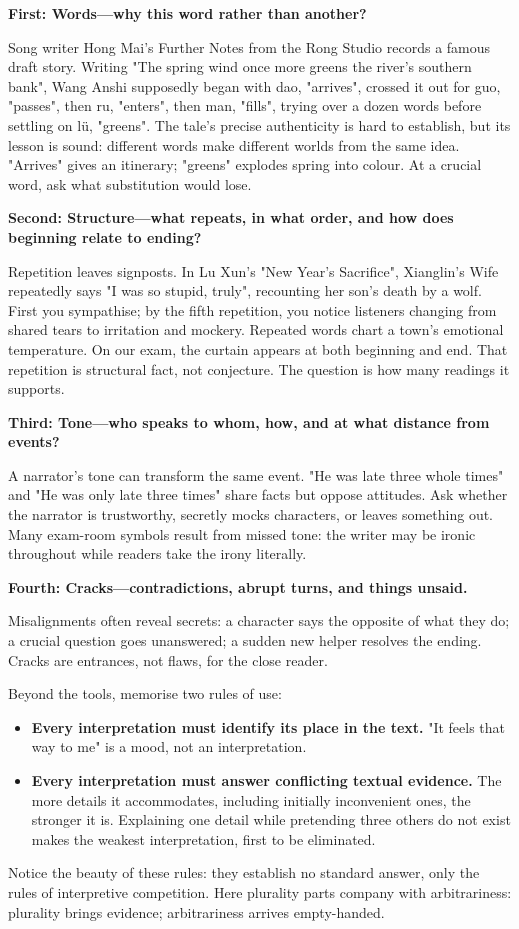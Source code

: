 \textbf{First: Words---why this word rather than another?}

Song writer Hong Mai's Further Notes from the Rong Studio records a famous draft story. Writing "The spring wind once more greens the river's southern bank", Wang Anshi supposedly began with dao, "arrives", crossed it out for guo, "passes", then ru, "enters", then man, "fills", trying over a dozen words before settling on lü, "greens". The tale's precise authenticity is hard to establish, but its lesson is sound: different words make different worlds from the same idea. "Arrives" gives an itinerary; "greens" explodes spring into colour. At a crucial word, ask what substitution would lose.

\textbf{Second: Structure---what repeats, in what order, and how does beginning relate to ending?}

Repetition leaves signposts. In Lu Xun's "New Year's Sacrifice", Xianglin's Wife repeatedly says "I was so stupid, truly", recounting her son's death by a wolf. First you sympathise; by the fifth repetition, you notice listeners changing from shared tears to irritation and mockery. Repeated words chart a town's emotional temperature. On our exam, the curtain appears at both beginning and end. That repetition is structural fact, not conjecture. The question is how many readings it supports.

\textbf{Third: Tone---who speaks to whom, how, and at what distance from events?}

A narrator's tone can transform the same event. "He was late three whole times" and "He was only late three times" share facts but oppose attitudes. Ask whether the narrator is trustworthy, secretly mocks characters, or leaves something out. Many exam-room symbols result from missed tone: the writer may be ironic throughout while readers take the irony literally.

\textbf{Fourth: Cracks---contradictions, abrupt turns, and things unsaid.}

Misalignments often reveal secrets: a character says the opposite of what they do; a crucial question goes unanswered; a sudden new helper resolves the ending. Cracks are entrances, not flaws, for the close reader.

Beyond the tools, memorise two rules of use:

\begin{itemize}
\item \textbf{Every interpretation must identify its place in the text.} "It feels that way to me" is a mood, not an interpretation.
\item \textbf{Every interpretation must answer conflicting textual evidence.} The more details it accommodates, including initially inconvenient ones, the stronger it is. Explaining one detail while pretending three others do not exist makes the weakest interpretation, first to be eliminated.
\end{itemize}
Notice the beauty of these rules: they establish no standard answer, only the rules of interpretive competition. Here plurality parts company with arbitrariness: plurality brings evidence; arbitrariness arrives empty-handed.

